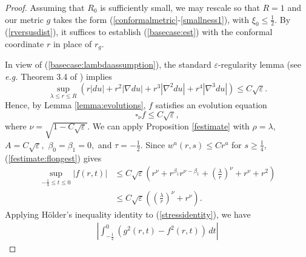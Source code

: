\documentclass[12pt]{amsart}
\newcommand{\T}{{\mathcal T}}
\theoremstyle{others}
\numberwithin{equation}{section}
\newcommand{\eps}{\varepsilon}
\begin{document}
\begin{proof} 
Assuming that $R_0$ is sufficiently small, we may rescale so that $R = 1$ and our metric $g$ takes the form (\ref{conformalmetric}-\ref{smallness1}), with $\xi_0 \leq \frac12.$ By (\ref{rversusdist}), it suffices to establish (\ref{basecase:est}) with the conformal coordinate $r$ in place of $r_g.$



In view of (\ref{basecase:lambdaassumption}), the standard $\eps$-regularity lemma (see {\it e.g.} Theorem 3.4 of \cite{songwaldron}) implies
\begin{equation}\label{basecase:crudestimate}
\sup_{\lambda \leq r \leq R} \left( r |du| + r^2 |\nabla du| + r^3 |\nabla^2 du | + r^4 |\nabla^3 du | \right) \leq C \sqrt{\eps}.
\end{equation}
Hence, by Lemma \ref{lemma:evolutions}, $f$ satisfies an evolution equation
$$\square_\nu f \leq C \sqrt{\eps},$$
where $\nu = \sqrt{1 - C \sqrt{\eps}}.$
We can apply Proposition \ref{festimate}  with $\rho = \lambda,$ $A = C \sqrt{\eps},$ $\beta_0 = \beta_1 = 0,$ and $\tau = -\frac12.$ Since $w^a(r, s) \leq C r^a$ for $s \geq \frac14,$ (\ref{festimate:flongest}) gives
\begin{equation}\label{basecase:improvedfestimate}
\begin{split}
\sup_{-\frac14 \leq t \leq 0} | f(r,t) | & \leq C\sqrt{\eps} \left( r^{\nu} + r^{\beta_1} r^{\nu - \beta_1} + \left( \frac{\lambda}{r} \right)^\nu + r^\nu + r^{2} \right) \\
& \leq C \sqrt{\eps} \left( \left( \frac{\lambda}{r} \right)^\nu  + r^\nu \right).
\end{split}
\end{equation}
Applying H\"older's inequality identity to (\ref{stressidentity}), we have
\begin{equation}\label{basecase:holder}
\begin{split}
\left| \int_{-\frac12}^{0} \left( g^2(r, t) - f^2(r, t) \right) \, dt \right| %

\end{split}
\end{equation}
\end{proof}
\end{document}
